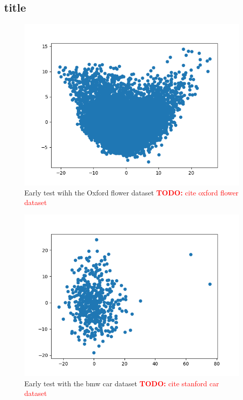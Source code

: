 \documentclass[journal]{vgtc}       %
\newcommand{\todo}[1]{\textcolor{red}{\textbf{TODO:} #1}}
\begin{document}
\subsection{title}
\begin{figure}[tb]
  \begin{center}
  \includegraphics[width=.75\linewidth]{Figure1.png}
  \end{center}
  \caption{\label{fig:lorem} Early test wihh the Oxford flower dataset \todo{cite oxford flower dataset}}
\end{figure} 
\begin{figure}[tb]
  \begin{center}
  \includegraphics[width=.75\linewidth]{Figure2.png}
  \end{center}
  \caption{\label{fig:bmw} Early test with the bmw car dataset \todo{cite stanford car dataset}\cite{stanfordcar}}
\end{figure}
\end{document}

